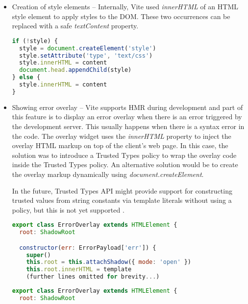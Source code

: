 \begin{itemize}
  \item Creation of style elements -- Internally, Vite used \emph{innerHTML} of an HTML style
        element to apply styles to the DOM. These two occurrences can be replaced with a
        safe \emph{textContent} property.

        \bigskip
        \begin{lstlisting}[language=JavaScript, caption=Creation of style elements using \emph{innerHTML} in Vite \cite{commit_vite_inner_html_styles}]
if (!style) {
  style = document.createElement('style')
  style.setAttribute('type', 'text/css')
  style.innerHTML = content
  document.head.appendChild(style)
} else {
  style.innerHTML = content
}
\end{lstlisting}

  \item Showing error overlay -- Vite supports HMR during development and part of this feature is to
        display an error overlay when there is an error triggered by the development server. This
        usually happens when there is a syntax error in the code. The overlay widget uses the
        \emph{innerHTML} property to inject the overlay HTML markup on top of the client's web
        page. In this case, the solution was to introduce a Trusted Types policy to wrap the overlay
        code inside the Trusted Types policy. An alternative solution would be to create the overlay
        markup dynamically using \emph{document.createElement}.

        In the future, Trusted Types API might provide support for constructing trusted values from
        string constants via template literals without using a policy, but this is not yet supported
        \cite{tt_from_literal_method}.

        \bigskip
        \begin{lstlisting}[language=JavaScript, caption=Creation of error overlay using \emph{innerHTML} property \cite{commit_vite_inner_html_overlay}]
export class ErrorOverlay extends HTMLElement {
  root: ShadowRoot

  constructor(err: ErrorPayload['err']) {
    super()
    this.root = this.attachShadow({ mode: 'open' })
    this.root.innerHTML = template
    (further lines omitted for brevity...)
\end{lstlisting}

        \bigskip
        \begin{lstlisting}[language=JavaScript, caption=Creation of error overlay using Trusted Types policy \cite{commit_vite_policy_overlay}]
export class ErrorOverlay extends HTMLElement {
  root: ShadowRoot


\end{lstlisting}
\end{itemize}
